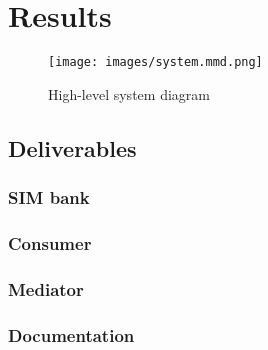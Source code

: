 \chapter{Results}

\begin{figure}[ht]
	\texttt{[image: images/system.mmd.png]}
	\caption{High-level system diagram}
	\label{fig:system-diagram}
\end{figure}

\section{Deliverables}

\subsection{SIM bank}

\subsection{Consumer}

\subsection{Mediator}

\subsection{Documentation}
